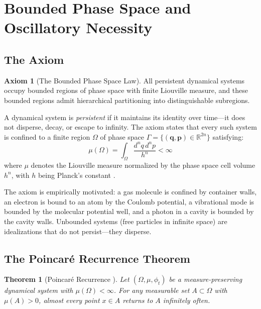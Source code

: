 \documentclass[11pt,twocolumn,a4paper]{article}
\newtheorem{theorem}{Theorem}[section]
\theoremstyle{definition}
\newtheorem{axiom}{Axiom}
\theoremstyle{remark}
\newcommand{\Real}{\mathbb{R}}
\begin{document}
\section{Bounded Phase Space and Oscillatory Necessity}
\label{sec:bounded_phase_space}

\subsection{The Axiom}

\begin{axiom}[The Bounded Phase Space Law]
\label{ax:bpsl}
All persistent dynamical systems occupy bounded regions of phase space with finite Liouville measure, and these bounded regions admit hierarchical partitioning into distinguishable subregions.
\end{axiom}

A dynamical system is \emph{persistent} if it maintains its identity over time---it does not disperse, decay, or escape to infinity. The axiom states that every such system is confined to a finite region $\Omega$ of phase space $\Gamma = \{(\mathbf{q}, \mathbf{p}) \in \Real^{2n}\}$ satisfying:
\begin{equation}
\mu(\Omega) = \int_\Omega \frac{d^n q \, d^n p}{h^n} < \infty
\label{eq:finite_measure}
\end{equation}
where $\mu$ denotes the Liouville measure normalized by the phase space cell volume $h^n$, with $h$ being Planck's constant \citep{planck1901}.

The axiom is empirically motivated: a gas molecule is confined by container walls, an electron is bound to an atom by the Coulomb potential, a vibrational mode is bounded by the molecular potential well, and a photon in a cavity is bounded by the cavity walls. Unbounded systems (free particles in infinite space) are idealizations that do not persist---they disperse.

\subsection{The Poincar\'e Recurrence Theorem}

\begin{theorem}[Poincar\'e Recurrence \citep{poincare1890}]
\label{thm:poincare}
Let $(\Omega, \mu, \phi_t)$ be a measure-preserving dynamical system with $\mu(\Omega) < \infty$. For any measurable set $A \subset \Omega$ with $\mu(A) > 0$, almost every point $x \in A$ returns to $A$ infinitely often.
\end{theorem}
\end{document}
